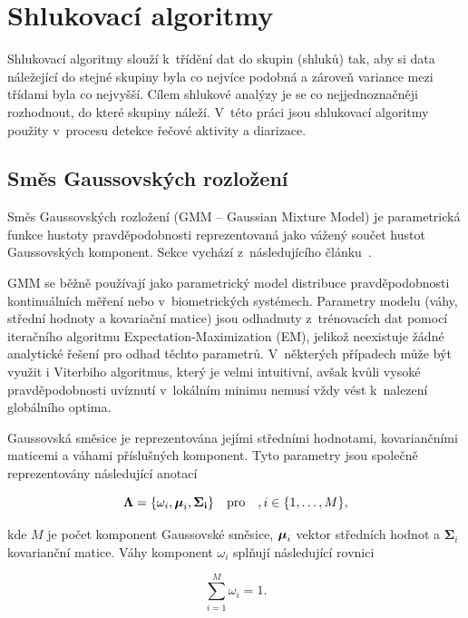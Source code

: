 \section{Shlukovací algoritmy}
Shlukovací algoritmy slouží k~třídění dat do skupin (shluků) tak, aby si data náležející do stejné skupiny byla co nejvíce podobná a zároveň variance mezi třídami byla co nejvyšší. Cílem shlukové analýzy je se co nejjednoznačněji rozhodnout, do které skupiny  náleží. V~této práci jsou shlukovací algoritmy použity v~procesu detekce řečové aktivity a diarizace.

\subsection{Směs Gaussovských rozložení}
\label{subsection:GMM}
Směs Gaussovských rozložení (GMM -- Gaussian Mixture Model) je parametrická funkce hustoty pravděpodobnosti reprezentovaná jako vážený součet hustot Gaussovských komponent. Sekce vychází z~následujícího článku~\cite{Reynolds2009GaussianMM}.

GMM se běžně používají jako parametrický model distribuce pravděpodobnosti kontinuálních měření nebo v~biometrických systémech. Parametry modelu (váhy, střední hodnoty a kovariační matice) jsou odhadnuty z~trénovacích dat pomocí iteračního algoritmu Expectation-Maximization (EM), jelikož neexistuje žádné analytické řešení pro odhad těchto parametrů. V~některých případech může být využit i Viterbiho algoritmus, který je velmi intuitivní, avšak kvůli vysoké pravděpodobnosti uvíznutí v~lokálním minimu nemusí vždy vést k~nalezení globálního optima.

Gaussovská směsice je reprezentována jejími středními hodnotami, kovariančními maticemi a váhami příslušných komponent. Tyto parametry jsou společně reprezentovány následující anotací

\begin{equation}
    \label{eqn:GMM_params}
    \mathbf{\Lambda} = \{\omega_i, \text{\boldmath$\mu$}_{i}, \mathbf{\Sigma_i}\}\quad \text{pro}\quad, i \in \{1, \dots, M\},
\end{equation}

kde $M$ je počet komponent Gaussovské směsice, $\text{\boldmath$\mu$}_{i}$ vektor středních hodnot a $\mathbf{\Sigma}_i$ kovarianční matice. Váhy komponent $\omega_{i}$ splňují následující rovnici

\begin{equation}
    \label{eqn:GMM_weights_sum}
    \sum_{i=1}^{M} \omega_i = 1.
\end{equation}

